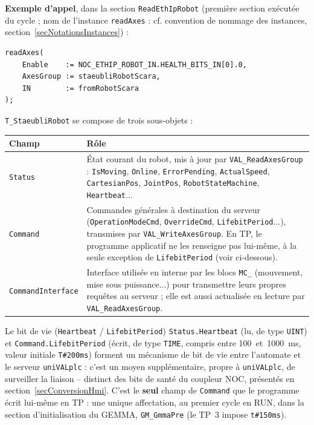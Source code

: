 \textbf{Exemple d'appel}, dans la section \texttt{ReadEthIpRobot}
(première section exécutée du cycle ; nom de l'instance \texttt{readAxes} : cf. convention de nommage des instances, section~\ref{secNotationsInstances}) :

\begin{lstlisting}
readAxes(
    Enable    := NOC_ETHIP_ROBOT_IN.HEALTH_BITS_IN[0].0,
    AxesGroup := staeubliRobotScara,
    IN        := fromRobotScara
);
\end{lstlisting}

\texttt{T\_StaeubliRobot} se compose de trois sous-objets :

\begin{center}
\begin{tabular}{|l|p{9.5cm}|}
\hline
\textbf{Champ} & \textbf{Rôle} \\
\hline
\texttt{Status} & État courant du robot, mis à jour par
\texttt{VAL\_ReadAxesGroup} : \texttt{IsMoving}, \texttt{Online},
\texttt{ErrorPending}, \texttt{ActualSpeed}, \texttt{CartesianPos},
\texttt{JointPos}, \texttt{RobotStateMachine}, \texttt{Heartbeat}... \\
\hline
\texttt{Command} & Commandes générales à destination du serveur
(\texttt{OperationModeCmd}, \texttt{OverrideCmd}, \texttt{LifebitPeriod}...),
transmises par \texttt{VAL\_WriteAxesGroup}. En TP, le programme
applicatif ne les renseigne pas lui-même, à la seule exception de
\texttt{LifebitPeriod} (voir ci-dessous). \\
\hline
\texttt{CommandInterface} & Interface utilisée en interne par les blocs
\texttt{MC\_} (mouvement, mise sous puissance...) pour transmettre leurs
propres requêtes au serveur ; elle est aussi actualisée en lecture par
\texttt{VAL\_ReadAxesGroup}. \\
\hline
\end{tabular}
\end{center}

\begin{UPSTIinfor}{Le bit de vie (\texttt{Heartbeat} / \texttt{LifebitPeriod})}
\texttt{Status.Heartbeat} (lu, de type \texttt{UINT}) et
\texttt{Command.LifebitPeriod} (écrit, de type \texttt{TIME}, compris
entre 100~et~1000~ms, valeur initiale \texttt{T\#200ms}) forment un mécanisme de bit de vie entre
l'automate et le serveur \texttt{uniVALplc} : c'est un moyen
supplémentaire, propre à \texttt{uniVALplc}, de surveiller la liaison --
distinct des bits de santé du coupleur NOC, présentés en section~\ref{secConversionHmi}.
C'est le \textbf{seul} champ de \texttt{Command} que le programme écrit
lui-même en TP : une unique affectation, au premier cycle en RUN, dans la
section d'initialisation du GEMMA, \texttt{GM\_GmmaPre} (le TP~3 impose \texttt{t\#150ms}).
\end{UPSTIinfor}

